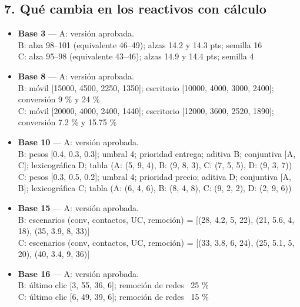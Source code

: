 \documentclass[10pt,letterpaper]{article}
\begin{document}
\subsection*{7. Qué cambia en los reactivos con cálculo}
\begin{itemize}[leftmargin=1.2em,itemsep=1pt,topsep=1pt]\footnotesize
\item \textbf{Base 3} --- A: versión aprobada.
\\ \hspace{1em}B: alza 98--101 (equivalente 46--49); alzas 14.2 y 14.3 pts; semilla 16
\\ \hspace{1em}C: alza 95--98 (equivalente 43--46); alzas 14.9 y 14.4 pts; semilla 4
\item \textbf{Base 8} --- A: versión aprobada.
\\ \hspace{1em}B: móvil [15000, 4500, 2250, 1350]; escritorio [10000, 4000, 3000, 2400]; conversión 9 \% y 24 \%
\\ \hspace{1em}C: móvil [20000, 4000, 2400, 1440]; escritorio [12000, 3600, 2520, 1890]; conversión 7.2 \% y 15.75 \%
\item \textbf{Base 10} --- A: versión aprobada.
\\ \hspace{1em}B: pesos [0.4, 0.3, 0.3]; umbral 4; prioridad entrega; aditiva B; conjuntiva [A, C]; lexicográfica D; tabla (A: (5, 9, 4), B: (9, 8, 3), C: (7, 5, 5), D: (9, 3, 7))
\\ \hspace{1em}C: pesos [0.3, 0.5, 0.2]; umbral 4; prioridad precio; aditiva D; conjuntiva [A, B]; lexicográfica C; tabla (A: (6, 4, 6), B: (8, 4, 8), C: (9, 2, 2), D: (2, 9, 6))
\item \textbf{Base 15} --- A: versión aprobada.
\\ \hspace{1em}B: escenarios (conv, contactos, UC, remoción) = [(28, 4.2, 5, 22), (21, 5.6, 4, 18), (35, 3.9, 8, 33)]
\\ \hspace{1em}C: escenarios (conv, contactos, UC, remoción) = [(33, 3.8, 6, 24), (25, 5.1, 5, 20), (40, 3.4, 9, 36)]
\item \textbf{Base 16} --- A: versión aprobada.
\\ \hspace{1em}B: último clic [3, 55, 36, 6]; remoción de redes ~25 \%
\\ \hspace{1em}C: último clic [6, 49, 39, 6]; remoción de redes ~15 \%

\end{itemize}
\end{document}
